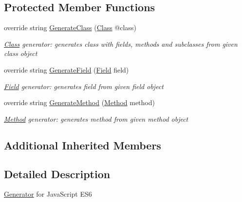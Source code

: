 \subsection*{Protected Member Functions}
\begin{DoxyCompactItemize}
\item 
override string \mbox{\hyperlink{classCodeGen_1_1generators_1_1ES6Generator_a53988e6898a5cf7b926e4c74a5af1703}{Generate\+Class}} (\mbox{\hyperlink{classCodeGen_1_1generators_1_1Class}{Class}} @class)
\begin{DoxyCompactList}\small\item\em \mbox{\hyperlink{classCodeGen_1_1generators_1_1Class}{Class}} generator\+: generates class with fields, methods and subclasses from given class object  \end{DoxyCompactList}\item 
override string \mbox{\hyperlink{classCodeGen_1_1generators_1_1ES6Generator_a35f257a51768270892dfa05dcf2c64c0}{Generate\+Field}} (\mbox{\hyperlink{classCodeGen_1_1generators_1_1Field}{Field}} field)
\begin{DoxyCompactList}\small\item\em \mbox{\hyperlink{classCodeGen_1_1generators_1_1Field}{Field}} generator\+: generates field from given field object  \end{DoxyCompactList}\item 
override string \mbox{\hyperlink{classCodeGen_1_1generators_1_1ES6Generator_a4107b28b436462ea13ce60b092c453f2}{Generate\+Method}} (\mbox{\hyperlink{classCodeGen_1_1generators_1_1Method}{Method}} method)
\begin{DoxyCompactList}\small\item\em \mbox{\hyperlink{classCodeGen_1_1generators_1_1Method}{Method}} generator\+: generates method from given method object  \end{DoxyCompactList}\end{DoxyCompactItemize}
\subsection*{Additional Inherited Members}


\subsection{Detailed Description}
\mbox{\hyperlink{classCodeGen_1_1generators_1_1Generator}{Generator}} for Java\+Script E\+S6 



